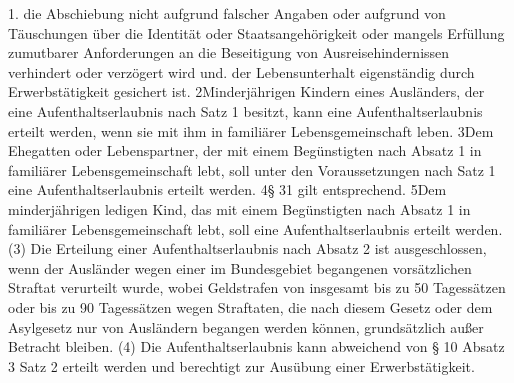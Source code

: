 1.	die Abschiebung nicht aufgrund falscher Angaben oder aufgrund von Täuschungen über die Identität oder Staatsangehörigkeit oder mangels Erfüllung zumutbarer Anforderungen an die Beseitigung von Ausreisehindernissen verhindert oder verzögert wird und.	der Lebensunterhalt eigenständig durch Erwerbstätigkeit gesichert ist.\newline
2Minderjährigen Kindern eines Ausländers, der eine Aufenthaltserlaubnis nach Satz 1 besitzt, kann eine Aufenthaltserlaubnis erteilt werden, wenn sie mit ihm in familiärer Lebensgemeinschaft leben. 3Dem Ehegatten oder Lebenspartner, der mit einem Begünstigten nach Absatz 1 in familiärer Lebensgemeinschaft lebt, soll unter den Voraussetzungen nach Satz 1 eine Aufenthaltserlaubnis erteilt werden. 4§ 31 gilt entsprechend. 5Dem minderjährigen ledigen Kind, das mit einem Begünstigten nach Absatz 1 in familiärer Lebensgemeinschaft lebt, soll eine Aufenthaltserlaubnis erteilt werden.\newline
(3) Die Erteilung einer Aufenthaltserlaubnis nach Absatz 2 ist ausgeschlossen, wenn der Ausländer wegen einer im Bundesgebiet begangenen vorsätzlichen Straftat verurteilt wurde, wobei Geldstrafen von insgesamt bis zu 50 Tagessätzen oder bis zu 90 Tagessätzen wegen Straftaten, die nach diesem Gesetz oder dem Asylgesetz nur von Ausländern begangen werden können, grundsätzlich außer Betracht bleiben.\newline
(4) Die Aufenthaltserlaubnis kann abweichend von § 10 Absatz 3 Satz 2 erteilt werden und berechtigt zur Ausübung einer Erwerbstätigkeit.